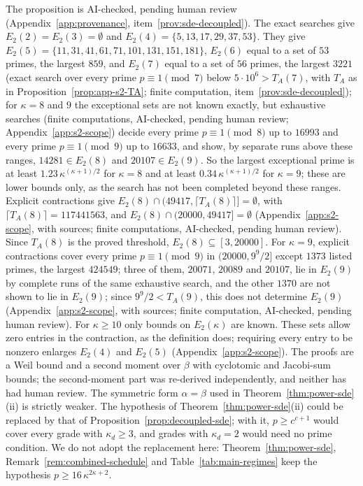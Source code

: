 The proposition is AI-checked, pending human review (Appendix~\ref{app:provenance}, item~\ref{prov:sde-decoupled}). The exact searches give $E_2(2) = E_2(3) = \emptyset$ and $E_2(4) = \{5,13,17,29,37,53\}$. They give $E_2(5) = \{11,31,41,61,71,101,131,151,181\}$, $E_2(6)$ equal to a set of $53$ primes, the largest $859$, and $E_2(7)$ equal to a set of $56$ primes, the largest $3221$ (exact search over every prime $p \equiv 1 \pmod 7$ below $5\cdot10^6 > T_A(7)$, with $T_A$ as in Proposition~\ref{prop:app-s2-TA}; finite computation, item~\ref{prov:sde-decoupled}); for $\kappa = 8$ and $9$ the exceptional sets are not known exactly, but exhaustive searches (finite computations, AI-checked, pending human review; Appendix~\ref{app:s2-scope}) decide every prime $p \equiv 1 \pmod 8$ up to $16993$ and every prime $p \equiv 1 \pmod 9$ up to $16633$, and show, by separate runs above these ranges, $14281 \in E_2(8)$ and $20107 \in E_2(9)$. So the largest exceptional prime is at least $1.23\,\kappa^{(\kappa+1)/2}$ for $\kappa = 8$ and at least $0.34\,\kappa^{(\kappa+1)/2}$ for $\kappa = 9$; these are lower bounds only, as the search has not been completed beyond these ranges. Explicit contractions give $E_2(8) \cap (49417, \lceil T_A(8)\rceil] = \emptyset$, with $\lceil T_A(8)\rceil = 117441563$, and $E_2(8) \cap (20000, 49417] = \emptyset$ (Appendix~\ref{app:s2-scope}, with sources; finite computations, AI-checked, pending human review). Since $T_A(8)$ is the proved threshold, $E_2(8) \subseteq [3, 20000]$. For $\kappa = 9$, explicit contractions cover every prime $p \equiv 1 \pmod 9$ in $(20000, 9^9/2]$ except $1373$ listed primes, the largest $424549$; three of them, $20071$, $20089$ and $20107$, lie in $E_2(9)$ by complete runs of the same exhaustive search, and the other $1370$ are not shown to lie in $E_2(9)$; since $9^9/2 < T_A(9)$, this does not determine $E_2(9)$ (Appendix~\ref{app:s2-scope}, with sources; finite computation, AI-checked, pending human review). For $\kappa \ge 10$ only bounds on $E_2(\kappa)$ are known. These sets allow zero entries in the contraction, as the definition does; requiring every entry to be nonzero enlarges $E_2(4)$ and $E_2(5)$ (Appendix~\ref{app:s2-scope}). The proofs are a Weil bound and a second moment over $\beta$ with cyclotomic and Jacobi-sum bounds; the second-moment part was re-derived independently, and neither has had human review. The symmetric form $\alpha = \beta$ used in Theorem~\ref{thm:power-sde}(ii) is strictly weaker. The hypothesis of Theorem~\ref{thm:power-sde}(ii) could be replaced by that of Proposition~\ref{prop:decoupled-sde}; with it, $p \ge c^{c+1}$ would cover every grade with $\kappa_d \ge 3$, and grades with $\kappa_d = 2$ would need no prime condition. We do not adopt the replacement here: Theorem~\ref{thm:power-sde}, Remark~\ref{rem:combined-schedule} and Table~\ref{tab:main-regimes} keep the hypothesis $p \ge 16\,\kappa^{2\kappa+2}$.

